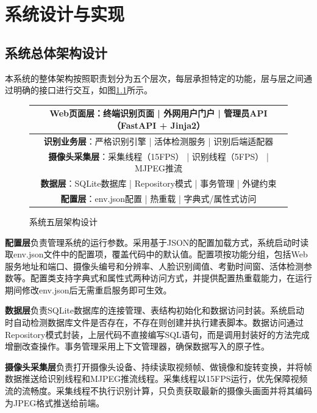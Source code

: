 \chapter{系统设计与实现}

\section{系统总体架构设计}

本系统的整体架构按照职责划分为五个层次，每层承担特定的功能，层与层之间通过明确的接口进行交互，如图\ref{fig:arch}所示。

\begin{figure}[htbp]
    \centering
    \begin{tabular}{|p{12cm}|}
    \hline
    \multicolumn{1}{|c|}{\textbf{Web页面层}：终端识别页面 | 外网用户门户 | 管理员API（FastAPI + Jinja2）} \\
    \hline
    \multicolumn{1}{|c|}{\textbf{识别业务层}：严格识别引擎 | 活体检测服务 | 识别后端适配器} \\
    \hline
    \multicolumn{1}{|c|}{\textbf{摄像头采集层}：采集线程（15FPS） | 识别线程（5FPS） | MJPEG推流} \\
    \hline
    \multicolumn{1}{|c|}{\textbf{数据层}：SQLite数据库 | Repository模式 | 事务管理 | 外键约束} \\
    \hline
    \multicolumn{1}{|c|}{\textbf{配置层}：env.json配置 | 热重载 | 字典式/属性式访问} \\
    \hline
    \end{tabular}
    \caption{系统五层架构设计}
    \label{fig:arch}
\end{figure}

\textbf{配置层}负责管理系统的运行参数。采用基于JSON的配置加载方式，系统启动时读取env.json文件中的配置项，覆盖代码中的默认值。配置项按功能分组，包括Web服务地址和端口、摄像头编号和分辨率、人脸识别阈值、考勤时间窗、活体检测参数等。配置类支持字典式和属性式两种访问方式，并提供配置热重载能力，在运行期间修改env.json后无需重启服务即可生效。

\textbf{数据层}负责SQLite数据库的连接管理、表结构初始化和数据访问封装。系统启动时自动检测数据库文件是否存在，不存在则创建并执行建表脚本。数据访问通过Repository模式封装，上层代码不直接编写SQL语句，而是调用封装好的方法完成增删改查操作。事务管理采用上下文管理器，确保数据写入的原子性。

\textbf{摄像头采集层}负责打开摄像头设备、持续读取视频帧、做镜像和旋转变换，并将帧数据推送给识别线程和MJPEG推流线程。采集线程以15FPS运行，优先保障视频流的流畅度。采集线程不执行识别计算，只负责获取最新的摄像头画面并将其编码为JPEG格式推送给前端。

